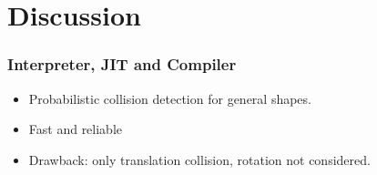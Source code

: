 \documentclass{beamer}
\begin{document}
\section{Discussion}

\begin{frame}
\frametitle{Interpreter, JIT and Compiler}
	\begin{itemize}
	\item Probabilistic collision detection for general shapes.
	\item Fast and reliable
	\item Drawback: only translation collision, rotation not considered.
	\end{itemize}
\end{frame}

\end{document}
